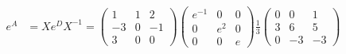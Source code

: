 \documentclass{article}
\begin{document}
\begin{align*}
    \\
    e^A &= Xe^DX^{-1} = \begin{pmatrix} 1 & 1 & 2 \\ -3 & 0 & -1 \\ 3 & 0 & 0 \end{pmatrix} \begin{pmatrix} e^{-1} & 0 & 0 \\ 0 & e^2 & 0 \\ 0 & 0 & e \end{pmatrix} \frac{1}{3} \begin{pmatrix} 0 & 0 & 1 \\ 3 & 6 & 5 \\ 0 & -3 & -3 \end{pmatrix} \\
\end{align*}
\end{document}

